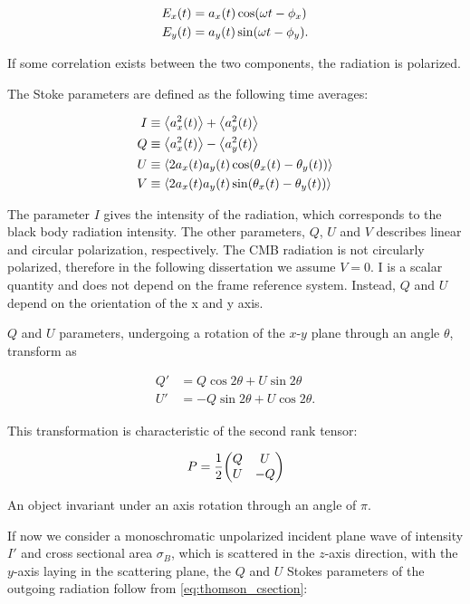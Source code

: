 \begin{align}
        E_x\qty(t) & = a_x\qty(t)\cos(\omega t - \phi_x) \\
        E_y\qty(t) & = a_y\qty(t)\sin(\omega t - \phi_y).
\end{align}

If some correlation exists between the two components, the radiation is
polarized.

The Stoke parameters are defined as the following time averages:

\begin{align}
        I & \equiv \expval{a^2_x\qty(t)} + \expval{a^2_y\qty(t)} \\
        Q & \equiv \expval{a^2_x\qty(t)} - \expval{a^2_y\qty(t)} \\
        U & \equiv \expval{2a_x\qty(t)a_y\qty(t)
        \cos(\theta_x\qty(t) - \theta_y\qty(t))} \\
        V & \equiv \expval{2a_x\qty(t)a_y\qty(t)
        \sin(\theta_x\qty(t) - \theta_y\qty(t))}
\end{align}

The parameter $I$ gives the intensity of the radiation, which corresponds
to the black body radiation intensity. The other parameters, $Q$, $U$ and
$V$ describes linear and circular polarization, respectively. The CMB
radiation is not circularly polarized, therefore in the following
dissertation we assume $V = 0$. I is a scalar quantity and does not depend
on the frame reference system. Instead, $Q$ and $U$ depend on the
orientation of the x and y axis.

$Q$ and $U$ parameters, undergoing a rotation of the $x$-$y$ plane through
an angle $\theta$, transform as

\begin{align}
        Q' & = Q\cos{2\theta} + U\sin{2\theta} \\
        U' & = -Q\sin{2\theta} + U\cos{2\theta}.
\end{align}

This transformation is characteristic of the second rank tensor:

\begin{equation}
        P = \frac{1}{2} \mqty(Q & U \\
                              U & -Q)
\end{equation}

An object invariant under an axis rotation through an angle of $\pi$.

If now we consider a monoschromatic unpolarized incident plane wave of
intensity $I'$ and cross sectional area $\sigma_B$, which is scattered in
the $z$-axis direction, with the $y$-axis laying in the scattering plane,
the $Q$ and $U$ Stokes parameters of the outgoing radiation follow from
\autoref{eq:thomson_csection}:

